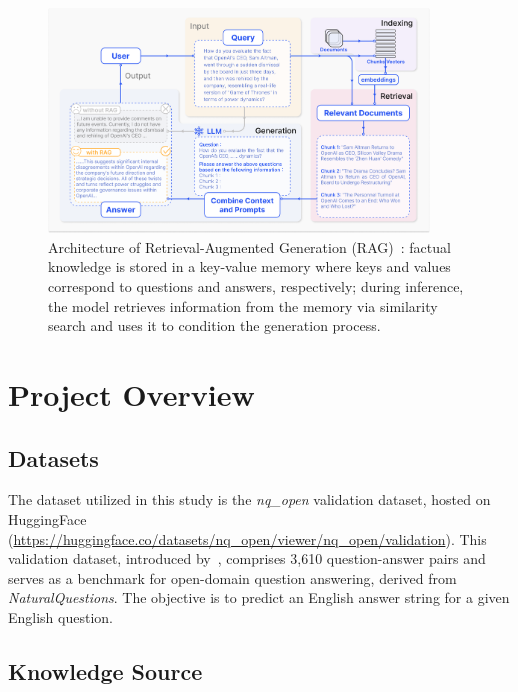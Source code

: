 \begin{figure}[t]
\begin{center}
\includegraphics[width=0.9\textwidth]{images/RAG_case.png}
\end{center}
\caption{
Architecture of Retrieval-Augmented Generation (RAG)~\citep{gao2024retrievalaugmented}: factual knowledge is stored in a key-value memory where keys and values correspond to questions and answers, respectively;
during inference, the model retrieves information from the memory via similarity search and uses it to condition the generation process.
}
\label{fig:arch}
\end{figure}

\section{Project Overview}

\subsection{Datasets}

The dataset utilized in this study is the \emph{nq\_open} validation dataset, hosted on HuggingFace (\url{https://huggingface.co/datasets/nq_open/viewer/nq_open/validation}). This validation dataset, introduced by~\citep{lee-etal-2019-latent}, comprises 3,610 question-answer pairs and serves as a benchmark for open-domain question answering, derived from \emph{NaturalQuestions}. The objective is to predict an English answer string for a given English question.

\subsection{Knowledge Source}

